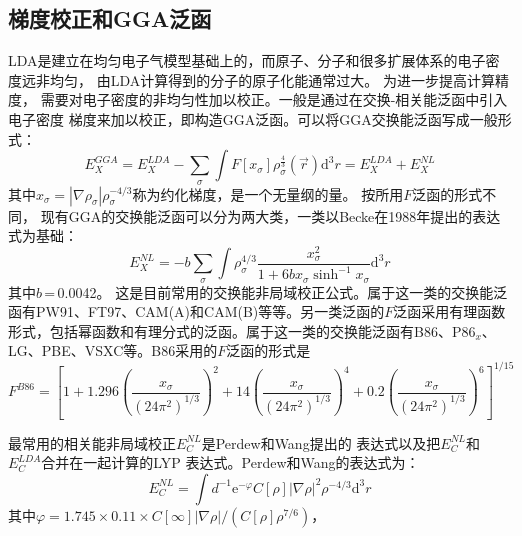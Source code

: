 \subsection{梯度校正和GGA泛函}
LDA是建立在均匀电子气模型基础上{的}，而原子、分子和很多扩展体系的电子密度远非均匀，%
由LDA计算得到的分子的原子化能{通常}过大。%
{为}进一步提高计算精度，%
需要对电子密度的非均匀性加以校正。一般是通过在交换-相关能泛函中引入电子密度%
梯度来加以校正{，}即构造GGA泛函。可以将GGA交换能泛函写成一般形式：
\begin{equation}
  E_X^{GGA}=E_X^{LDA}-\sum_{\sigma}\int F[x_{\sigma}]\rho_{\sigma}^{\frac43}(\vec r)\textrm{d}^3r{=E_X^{LDA}+E_X^{NL}}
  \label{eq:dft-18}
\end{equation}
其中$x_{\sigma}=|\nabla\rho_{\sigma}|\rho_{\sigma}^{-4/3}$称为约化梯度，是一个无量纲的量。%
{按}所用$F${泛函}的形式不同，%
{现有}GGA的交换能泛函可以分为两大类，一类以Becke\cite{PRA38-3098_1988}在1988年提出的表达式为基础：
\begin{equation}
  \label{eq:dft-9}
E_X^{NL}=-b\sum_{\sigma}\int\rho_{\sigma}^{4/3}\dfrac{x_{\sigma}^2}{1+6bx_{\sigma}\sinh^{-1}x_{\sigma}}\textrm{d}^3r
\end{equation}
其中$b$\,=\,0.0042{。}%
这是目前常用的交换能非局域校正公式。属于这一类的交换能泛函有PW91\cite{PRB46-6671_1992,PRB48-4978_1993,PRB54-16533_1996,PRB57-14999_1998}、FT97\cite{MP91-847_1997}、CAM(A)和CAM(B)\cite{JCP99-8765_1993}等等。另一类泛函的$F${泛函}采用有理函数{形式，}包括幂函数和有理分式的泛函。属于这一类的交换能泛函有B86\cite{JCP84-4524_1986}、P86$_x$\cite{PRB33-8800_1986}、LG\cite{PRA47-4681_1993}、PBE\cite{PRL77-1396_1996,IBID78-1396_1997}、VSXC\cite{JCP109-400_1998}等。B86采用的$F${泛函}的形式是
\begin{equation}
  F^{B86}=\left[1+1.296\left(\dfrac{x_{\sigma}}{(24\pi^2)^{1/3}}\right)^2+14\left(\dfrac{x_{\sigma}}{(24\pi^2)^{1/3}}\right)^4+0.2\left(\dfrac{x_{\sigma}}{(24\pi^2)^{1/3}}\right)^6\right]^{1/15}
  \label{eq:dft-19}
\end{equation}

最常用的相关能非局域校正{$E_C^{NL}$}是Perdew和Wang\cite{PRB33-8822_1986}提出的%
{表达}式以及把$E_C^{NL}$\linebreak 和$E_C^{LDA}$合{并}在一起计算的LYP%
{表达}式\cite{PRB37-785_1988}。Perdew和Wang的表达式为：
\begin{equation} 
  \label{eq:dft-10}
E_C^{NL}=\int{d^{-1}\textrm{e}^{-\varphi}C[\rho]|\nabla\rho|^2\rho^{-4/3}\textrm{d}^3r}
\end{equation}
其中$\varphi=1.745\times 0.11\times C[\infty]|\nabla\rho|/(C[\rho]\rho^{7/6})$，%

